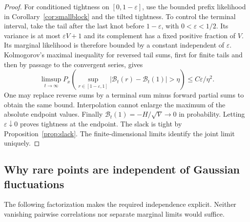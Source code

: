 \documentclass[11pt,a4paper]{article}
\numberwithin{equation}{section}
\theoremstyle{definition}
\theoremstyle{remark}
\newcommand{\eps}{\varepsilon}
\begin{document}
\begin{proof}
For conditioned tightness on $[0,1-\eps]$, use the bounded prefix
likelihood in Corollary~\ref{cor:smallblock} and the tilted tightness.
To control the terminal interval, take the tail after the last knot
before $1-\eps$, with $0<\eps<1/2$. Its variance is at most
$\eps V+1$ and its complement has a fixed positive fraction of $V$.
Its marginal likelihood is therefore bounded by a constant independent
of $\eps$. Kolmogorov's maximal inequality for reversed tail sums,
first for finite tails and then by passage to the convergent series,
gives
\begin{equation}
 \limsup_{t\to\infty}P_x\left(
 \sup_{r\in[1-\eps,1]}
 |\mathcal B_t(r)-\mathcal B_t(1)|>\eta\right)
 \le C\eps/\eta^2. \label{eq:terminaltight}
\end{equation}
One may replace reverse sums by a terminal sum minus forward partial
sums to obtain the same bound. Interpolation cannot enlarge the
maximum of the absolute endpoint values. Finally
$\mathcal B_t(1)=-H/\sqrt V\to0$ in probability. Letting
$\eps\downarrow0$ proves tightness at the endpoint. The slack is
tight by Proposition~\ref{prop:slack}. The finite-dimensional limits
identify the joint limit uniquely.
\end{proof}

\subsection{Why rare points are independent of Gaussian fluctuations}
The following factorization makes the required independence explicit.
Neither vanishing pairwise correlations nor separate marginal limits
would suffice.
\end{document}
